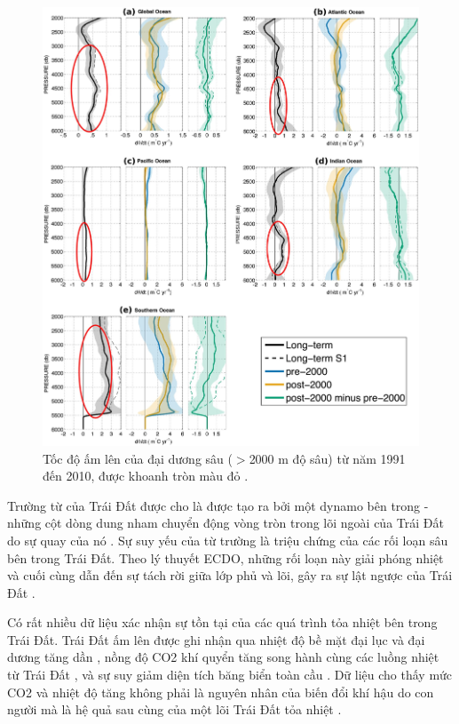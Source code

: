 \documentclass[10pt,twocolumn,letterpaper]{article}
\begin{document}
\begin{figure}[t]
\begin{center}
   \includegraphics[width=1\linewidth]{ocean-highlight.jpg}
\end{center}
   \caption{Tốc độ ấm lên của đại dương sâu ($>$2000 m độ sâu) từ năm 1991 đến 2010, được khoanh tròn màu đỏ \cite{132}.}
\label{fig:15}
\label{fig:onecol}
\end{figure}

Trường từ của Trái Đất được cho là được tạo ra bởi một dynamo bên trong - những cột dòng dung nham chuyển động vòng tròn trong lõi ngoài của Trái Đất do sự quay của nó \cite{123}. Sự suy yếu của từ trường là triệu chứng của các rối loạn sâu bên trong Trái Đất. Theo lý thuyết ECDO, những rối loạn này giải phóng nhiệt và cuối cùng dẫn đến sự tách rời giữa lớp phủ và lõi, gây ra sự lật ngược của Trái Đất \cite{1}.

Có rất nhiều dữ liệu xác nhận sự tồn tại của các quá trình tỏa nhiệt bên trong Trái Đất. Trái Đất ấm lên được ghi nhận qua nhiệt độ bề mặt đại lục và đại dương tăng dần \cite{127,128}, nồng độ CO2 khí quyển tăng song hành cùng các luồng nhiệt từ Trái Đất \cite{129,130}, và sự suy giảm diện tích băng biển toàn cầu \cite{131}. Dữ liệu cho thấy mức CO2 và nhiệt độ tăng không phải là nguyên nhân của biến đổi khí hậu do con người mà là hệ quả sau cùng của một lõi Trái Đất tỏa nhiệt \cite{129}.
\end{document}
